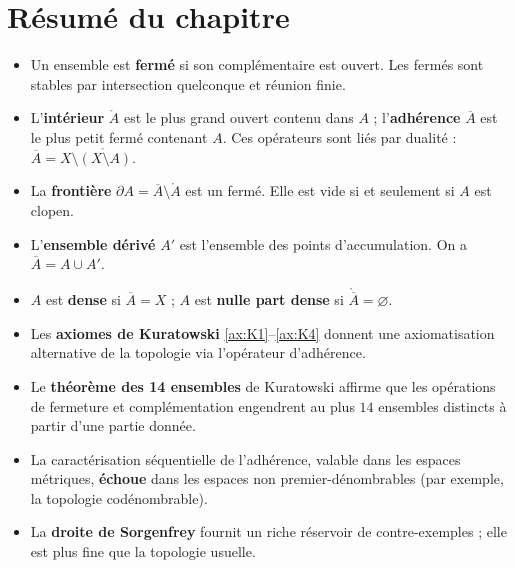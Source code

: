 \documentclass[12pt,a4paper,openany]{book}
\theoremstyle{definition}
\theoremstyle{cours}
\theoremstyle{coursnormal}
\newcommand{\Int}[1]{\mathring{#1}}
\newcommand{\Cl}[1]{\overline{#1}}
\newcommand{\Fr}[1]{\partial #1}
\begin{document}
\section*{Résumé du chapitre}

\begin{itemize}
  \item Un ensemble est \textbf{fermé} si son complémentaire est ouvert. Les fermés sont stables par intersection quelconque et réunion finie.
  \item L'\textbf{intérieur} $\Int{A}$ est le plus grand ouvert contenu dans $A$ ; l'\textbf{adhérence} $\Cl{A}$ est le plus petit fermé contenant $A$. Ces opérateurs sont liés par dualité : $\Cl{A} = X \setminus \Int{(X \setminus A)}$.
  \item La \textbf{frontière} $\Fr{A} = \Cl{A} \setminus \Int{A}$ est un fermé. Elle est vide si et seulement si $A$ est clopen.
  \item L'\textbf{ensemble dérivé} $A'$ est l'ensemble des points d'accumulation. On a $\Cl{A} = A \cup A'$.
  \item $A$ est \textbf{dense} si $\Cl{A} = X$ ; $A$ est \textbf{nulle part dense} si $\Int{\Cl{A}} = \varnothing$.
  \item Les \textbf{axiomes de Kuratowski} \ref{ax:K1}--\ref{ax:K4} donnent une axiomatisation alternative de la topologie via l'opérateur d'adhérence.
  \item Le \textbf{théorème des 14 ensembles} de Kuratowski affirme que les opérations de fermeture et complémentation engendrent au plus $14$ ensembles distincts à partir d'une partie donnée.
  \item La caractérisation séquentielle de l'adhérence, valable dans les espaces métriques, \textbf{échoue} dans les espaces non premier-dénombrables (par exemple, la topologie codénombrable).
  \item La \textbf{droite de Sorgenfrey} fournit un riche réservoir de contre-exemples ; elle est plus fine que la topologie usuelle.
\end{itemize}

%
%
\end{document}
